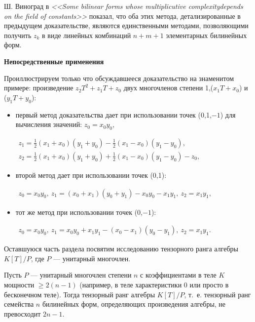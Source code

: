 \documentclass{mai_book}
\begin{document}
Ш. Виноград в \textit{<<Some bilinear forms whose multiplicutive complexity\linebreak depends on the field of constants>>} показал, что оба этих метода, детализированные в предыдущем доказательстве, являются единственными методами, позволяющими получить $z_k$ в виде линейных комбинаций $n+m+1$ элементарных билинейных форм.
\begin{beznomera}
  \textbf{Непосредственные применения}
  \end{beznomera}
Проиллюстрируем только что обсуждавшееся доказательство на знаменитом примере: произведение $z_2T^2+z_1T+z_0$ двух многочленов степени 1,($x_1T+x_0$) и ($y_1T+y_0$):
\begin{itemize}
\item{первый метод доказательства дает при использовании точек (0,1,$-1$) для вычисления значений: $z_0=x_0y_0$,
  \begin{center}
    $
    \begin{array}{l}
  z_1=\frac{1}{2}(x_1+x_0)(y_1+y_0)-\frac{1}{2}(x_1-x_0)(y_1-y_0), \\
  z_2=\frac{1}{2}(x_1+x_0)(y_1+y_0)+\frac{1}{2}(x_1-x_0)(y_1-y_0)-z_0,
\end{array}
  $
  \end{center}
  }
\item{второй метод дает при использовании точек (0,1):
  \begin{center}
    $
    \begin{array}{l}
    z_0=x_0y_0,\ z_1=(x_0+x_1)(y_0+y_1)-x_0y_0-x_1y_1,\ z_2=x_1y_1,
    \end{array}
    $
\end{center}}
\item{тот же метод при использовании точек (0,$-1$):
  \begin{center}
    $
    \begin{array}{l}
      z_0=x_0y_0,\ z_1=x_0y_0+x_1y_1-(x_0-x_1)(y_0-y_1),\ z_2=x_1y_1.
    \end{array}
    $
\end{center}}
  \end{itemize}
  \par
Оставшуюся часть раздела посвятим исследованию тензорного ранга алгебры $K[T]/P$, где $P$ --- унитарный многочлен.
\begin{property}
  Пусть $P$ --- унитарный многочлен степени $n$ с коэффициентами в теле $K$ мощности $\geqslant 2(n-1)$ (например, в теле характеристики 0 или просто в бесконечном теле). Тогда тензорный ранг алгебры $K[T]/P$, т.~е. тензорный ранг семейства $n$ билинейных форм, определяющих произведения алгебры, не превосходит $2n-1$.
  \end{property}
\end{document}
